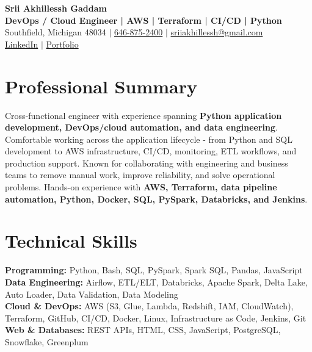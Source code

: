 \documentclass[letterpaper,10pt]{article}
\begin{document}
\fontsize{9.35pt}{10.45pt}\selectfont

\begin{center}
    {\LARGE \textbf{Srii Akhillessh Gaddam}} \\[-1pt]
    \textbf{DevOps / Cloud Engineer | AWS | Terraform | CI/CD | Python} \\[2pt]
    Southfield, Michigan 48034 $|$
    \href{tel:6468752400}{646-875-2400} $|$
    \href{mailto:sriiakhillessh@gmail.com}{sriiakhillessh@gmail.com} \\[1pt]
    \href{https://www.linkedin.com/in/srii-akhiilessh-gaddam-b48668191/}{LinkedIn} $|$
    \href{https://sriiakhillesshg.github.io/portfolio/}{Portfolio}
\end{center}
\vspace{-8pt}

\section{Professional Summary}
\small{Cross-functional engineer with experience spanning \textbf{Python application development, DevOps/cloud automation, and data engineering}. Comfortable working across the application lifecycle - from Python and SQL development to AWS infrastructure, CI/CD, monitoring, ETL workflows, and production support. Known for collaborating with engineering and business teams to remove manual work, improve reliability, and solve operational problems. Hands-on experience with \textbf{AWS, Terraform, data pipeline automation, Python, Docker, SQL, PySpark, Databricks, and Jenkins}.}

\section{Technical Skills}
\small{
\textbf{Programming:} Python, Bash, SQL, PySpark, Spark SQL, Pandas, JavaScript \\
\textbf{Data Engineering:} Airflow, ETL/ELT, Databricks, Apache Spark, Delta Lake, Auto Loader, Data Validation, Data Modeling \\
\textbf{Cloud \& DevOps:} AWS (S3, Glue, Lambda, Redshift, IAM, CloudWatch), Terraform, GitHub, CI/CD, Docker, Linux, Infrastructure as Code, Jenkins, Git \\
\textbf{Web \& Databases:} REST APIs, HTML, CSS, JavaScript, PostgreSQL, Snowflake, Greenplum
}
\end{document}
